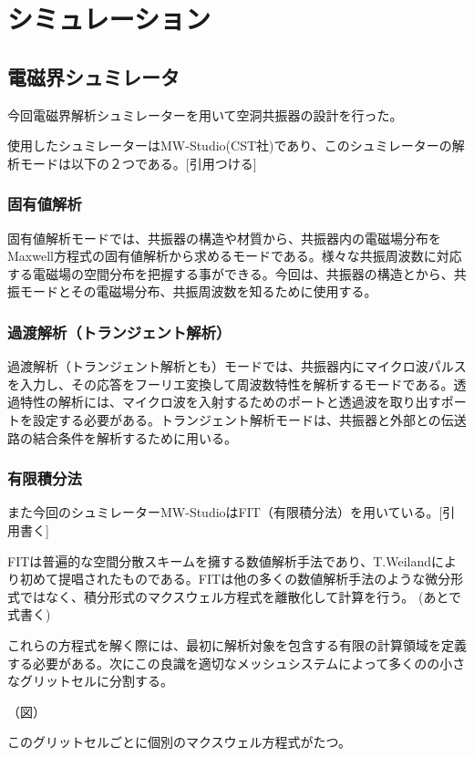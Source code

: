\chapter{シミュレーション}

\section{電磁界シュミレータ}
今回電磁界解析シュミレーターを用いて空洞共振器の設計を行った。

使用したシュミレーターはMW-Studio(CST社)であり、このシュミレーターの解析モードは以下の２つである。[引用つける]
\subsection{固有値解析}
固有値解析モードでは、共振器の構造や材質から、共振器内の電磁場分布をMaxwell方程式の固有値解析から求めるモードである。様々な共振周波数に対応する電磁場の空間分布を把握する事ができる。今回は、共振器の構造とから、共振モードとその電磁場分布、共振周波数を知るために使用する。

\subsection{過渡解析（トランジェント解析）}
過渡解析（トランジェント解析とも）モードでは、共振器内にマイクロ波パルスを入力し、その応答をフーリエ変換して周波数特性を解析するモードである。透過特性の解析には、マイクロ波を入射するためのポートと透過波を取り出すポートを設定する必要がある。トランジェント解析モードは、共振器と外部との伝送路の結合条件を解析するために用いる。

\subsection{有限積分法}
また今回のシュミレーターMW-StudioはFIT（有限積分法）を用いている。[引用書く]

FITは普遍的な空間分散スキームを擁する数値解析手法であり、T.Weilandにより初めて提唱されたものである。FITは他の多くの数値解析手法のような微分形式ではなく、積分形式のマクスウェル方程式を離散化して計算を行う。
(あとで式書く)

これらの方程式を解く際には、最初に解析対象を包含する有限の計算領域を定義する必要がある。次にこの良識を適切なメッシュシステムによって多くのの小さなグリットセルに分割する。

（図）

このグリットセルごとに個別のマクスウェル方程式がたつ。

